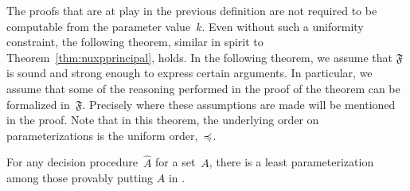 The proofs that are at play in the previous definition are not required to be computable from the parameter value~$k$.
Even without such a uniformity constraint, the following theorem, similar in spirit to Theorem~\ref{thm:nuxpprincipal}, holds.
In the following theorem, we assume that $\mathfrak{F}$ is sound and strong enough to express certain arguments.
In particular, we assume that some of the reasoning performed in the proof of the theorem can be formalized in~$\mathfrak{F}$.
Precisely where these assumptions are made will be mentioned in the proof.
Note that in this theorem, the underlying order on parameterizations is the uniform order,~$\preccurlyeq$.
\begin{theorem}
\label{thm:xpprincipal}%
  For any decision procedure~$\hat{A}$ for a set~$A$, there is a least parameterization among those provably putting $\hat{A}$ in .
\end{theorem}
